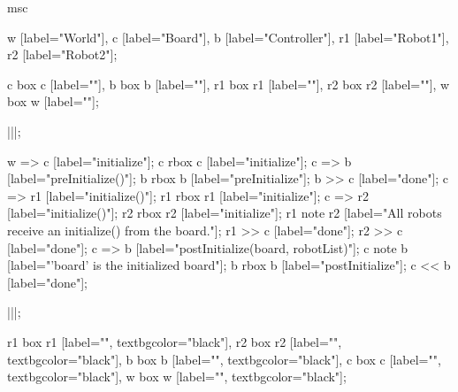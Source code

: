 \begin{msc}
msc
{

w [label="World"],
c [label="Board"],
b [label="Controller"],
r1 [label="Robot1"],
r2 [label="Robot2"];

c box c [label=""],
b box b [label=""],
r1 box r1 [label=""],
r2 box r2 [label=""],
w box w [label=""];

|||;

w => c [label="initialize"];
c rbox c [label="initialize"];
c => b [label="preInitialize()"];
b rbox b [label="preInitialize"];
b >> c [label="done"];
c => r1 [label="initialize()"];
r1 rbox r1 [label="initialize"];
c => r2 [label="initialize()"];
r2 rbox r2 [label="initialize"];
r1 note r2 [label="All robots receive an initialize() from the board."];
r1 >> c [label="done"];
r2 >> c [label="done"];
c => b [label="postInitialize(board, robotList)"];
c note b [label="'board' is the initialized board"];
b rbox b [label="postInitialize"];
c << b [label="done"];

|||;

r1 box r1 [label="", textbgcolor="black"],
r2 box r2 [label="", textbgcolor="black"],
b box b [label="", textbgcolor="black"],
c box c [label="", textbgcolor="black"],
w box w [label="", textbgcolor="black"];

}
\end{msc}
